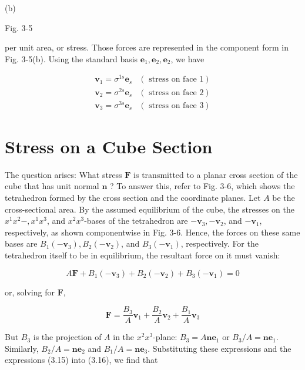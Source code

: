 \documentclass[10pt]{article}
\begin{document}
(b)

Fig. 3-5

per unit area, or stress. Those forces are represented in the component form in Fig. 3-5(b). Using the standard basis $\mathbf{e}_{1}, \mathbf{e}_{2}, \mathbf{e}_{2}$, we have

\[
\begin{array}{ll}
\mathbf{v}_{1}=\sigma^{1 s} \mathbf{e}_{s} & (\text { stress on face } 1) \\
\mathbf{v}_{2}=\sigma^{2 s} \mathbf{e}_{s} & (\text { stress on face } 2)  \tag{3.15}\\
\mathbf{v}_{3}=\sigma^{3 s} \mathbf{e}_{s} & (\text { stress on face } 3)
\end{array}
\]

\section*{Stress on a Cube Section}
The question arises: What stress $\mathbf{F}$ is transmitted to a planar cross section of the cube that has unit normal $\mathbf{n}$ ? To answer this, refer to Fig. 3-6, which shows the tetrahedron formed by the cross section and the coordinate planes. Let $A$ be the cross-sectional area. By the assumed equilibrium of the cube, the stresses on the $x^{1} x^{2}-, x^{1} x^{3}$, and $x^{2} x^{3}$-bases of the tetrahedron are $-\mathbf{v}_{3},-\mathbf{v}_{2}$, and $-\mathbf{v}_{1}$, respectively, as shown componentwise in Fig. 3-6. Hence, the forces on these same bases are $B_{1}\left(-\mathbf{v}_{3}\right), B_{2}\left(-\mathbf{v}_{2}\right)$, and $B_{3}\left(-\mathbf{v}_{1}\right)$, respectively. For the tetrahedron itself to be in equilibrium, the resultant force on it must vanish:

$$
A \mathbf{F}+B_{1}\left(-\mathbf{v}_{3}\right)+B_{2}\left(-\mathbf{v}_{2}\right)+B_{3}\left(-\mathbf{v}_{1}\right)=0
$$

or, solving for $\mathbf{F}$,


\begin{equation*}
\mathbf{F}=\frac{B_{3}}{A} \mathbf{v}_{1}+\frac{B_{2}}{A} \mathbf{v}_{2}+\frac{B_{1}}{A} \mathbf{v}_{3} \tag{3.16}
\end{equation*}


But $B_{3}$ is the projection of $A$ in the $x^{2} x^{3}$-plane: $B_{3}=A \mathbf{n e}_{1}$ or $B_{3} / A=\mathbf{n e}_{1}$. Similarly, $B_{2} / A=\mathbf{n e}_{2}$ and $B_{1} / A=\mathbf{n e}_{3}$. Substituting these expressions and the expressions (3.15) into (3.16), we find that
\end{document}
